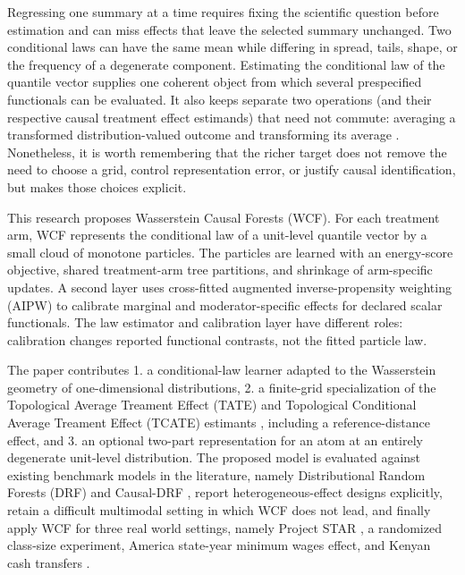 \documentclass[twoside]{article}
\begin{document}
Regressing one summary at a time requires fixing the scientific question before estimation and can miss effects that leave the selected summary unchanged. Two conditional laws can have the same mean while differing in spread, tails, shape, or the frequency of a degenerate component. Estimating the conditional law of the quantile vector supplies one coherent object from which several prespecified functionals can be evaluated. It also keeps separate two operations (and their respective causal treatment effect estimands) that need not commute: averaging a transformed distribution-valued outcome and transforming its average \citep{souto_diamantis_tcda_2026}. Nonetheless, it is worth remembering that the richer target does not remove the need to choose a grid, control representation error, or justify causal identification, but makes those choices explicit.

This research proposes Wasserstein Causal Forests (WCF). For each treatment arm, WCF represents the conditional law of a unit-level quantile vector by a small cloud of monotone particles. The particles are learned with an energy-score objective, shared treatment-arm tree partitions, and shrinkage of arm-specific updates. A second layer uses cross-fitted augmented inverse-propensity weighting (AIPW) to calibrate marginal and moderator-specific effects for declared scalar functionals. The law estimator and calibration layer have different roles: calibration changes reported functional contrasts, not the fitted particle law.

The paper contributes 1. a conditional-law learner adapted to the Wasserstein geometry of one-dimensional distributions, 2. a finite-grid specialization of the Topological Average Treament Effect (TATE) and Topological Conditional Average Treament Effect (TCATE) estimants \citep{souto_diamantis_tcda_2026}, including a reference-distance effect, and 3. an optional two-part representation for an atom at an entirely degenerate unit-level distribution. The proposed model is evaluated against existing benchmark models in the literature, namely Distributional Random Forests (DRF) \citep{DRF-paper} and Causal-DRF \citep{naf2026causaldrf}, report heterogeneous-effect designs explicitly, retain a difficult multimodal setting in which WCF does not lead, and finally apply WCF for three real world settings, namely Project STAR \citep{word1990state}, a randomized class-size experiment, America state-year minimum wages effect, and Kenyan cash transfers \citep{egger2022general,egger2024replication}.
\end{document}
